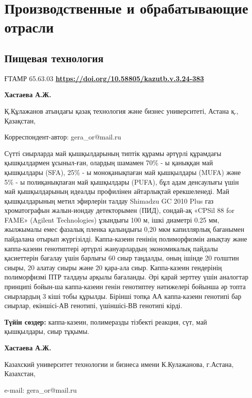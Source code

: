 \let\cleardoublepage\clearpage
\part{Производственные и обрабатывающие отрасли}
\chapter{Пищевая технология}
ҒТАМР 65.63.03
\hfill {\bfseries \href{https://doi.org/10.58805/kazutb.v.3.24-383}{https://doi.org/10.58805/kazutb.v.3.24-383}}


\begin{center}

{\bfseries Хастаева А.Ж.}

Қ.Құлажанов атындағы қазақ технология және бизнес университеті, Астана қ., Қазақстан,
\end{center}

\envelope Корреспондент-автор: gera\_or@mail.ru\vspace{0.5cm}

Сүтті сиырларда май қышқылдарының типтік құрамы әртүрлі құрамдағы
қышқылдармен ұсыныл-ған, олардың шамамен 70\% - ы қаныққан май қышқылдары
(SFA), 25\% - ы моноқанықпаған май қышқылдары (MUFA) және 5\% - ы
полиқанықпаған май қышқылдары (PUFA), бұл адам денсаулығы үшін май
қышқылдарының идеалды профилінен айтарлықтай ерекшеленеді. Май
қышқылдарының метил эфирлерін талдау Shimadzu GC 2010 Plus газ
хроматографын жалын-иондау детекторымен (ПИД), сондай-ақ «CPSil 88 for
FAME» (Agilent Technologies) ұзындығы 100 м, ішкі диаметрі 0.25 мм,
жылжымалы емес фазалық пленка қалыңдығы 0,20 мкм капиллярлық бағанымен
пайдалана отырып жүргізілді. Каппа-казеин генінің полиморфизмін анықтау
және каппа-казеин генотиптері әртүрлі жануарлардың экономикалық пайдалы
қасиеттерін бағалау үшін барлығы 60 сиыр таңдалды, оның ішінде 20
голштин сиыры, 20 алатау сиыры және 20 қара-ала сиыр. Каппа-казеин
гендерінің полиморфизмі ПТР талдауы арқылы бағаланды. Әрі қарай зерттеу
үшін аналогтар принципі бойын-ша каппа-казеин генін генотиптеу нәтижелері
бойынша әр топта сиырлардың 3 кіші тобы құрылды. Бірінші топқа АА
каппа-казеин генотипі бар сиырлар, екіншісі-АВ генотипі, үшіншісі-ВВ
генотипі кірді.

{\bfseries Түйін сөздер:} каппа-казеин, полимеразды тізбекті реакция, сүт,
май қышқылдары, сиыр тұқымы.

\begin{center}

{\bfseries Хастаева А.Ж.}

Казахский университет технологии и бизнеса имени К.Кулажанова, г.Астана,
Казахстан,

e-mail: gera\_or@mail.ru
\end{center}

